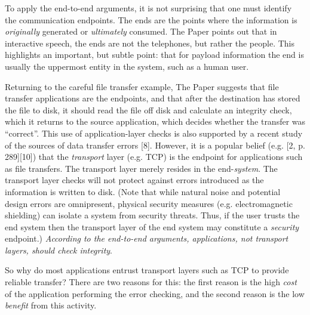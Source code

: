 \documentclass[a4paper,11pt,notitlepage,twoside,openright]{article}
\begin{document}
To apply the end-to-end arguments, it is not surprising that one must
identify the communication endpoints. The ends are the points where the
information is \emph{originally} generated or \emph{ultimately}
consumed. The Paper points out that in interactive speech, the ends are
not the telephones, but rather the people. This highlights an important,
but subtle point: that for payload information the end is usually the
uppermost entity in the system, such as a human user.

Returning to the careful file transfer example, The Paper suggests that
file transfer applications are the endpoints, and that after the
destination has stored the file to disk, it should read the file off
disk and calculate an integrity check, which it returns to the source
application, which decides whether the transfer was ``correct''. This
use of application-layer checks is also supported by a recent study of
the sources of data transfer errors {[}8{]}. However, it is a popular
belief (e.g. {[}2, p. 289{]}{[}10{]}) that the \emph{transport} layer
(e.g. TCP) is the endpoint for applications such as file transfers. The
transport layer merely resides in the end-\emph{system}. The transport
layer checks will not protect against errors introduced as the
information is written to disk. (Note that while natural noise and
potential design errors are omnipresent, physical security measures
(e.g. electromagnetic shielding) can isolate a system from security
threats. Thus, if the user trusts the end system then the transport
layer of the end system may constitute a \emph{security} endpoint.)
\emph{According to the end-to-end arguments, applications, not transport
layers, should check integrity}.

So why do most applications entrust transport layers such as TCP to
provide reliable transfer? There are two reasons for this: the first
reason is the high \emph{cost} of the application performing the error
checking, and the second reason is the low \emph{benefit} from this
activity.
\end{document}
